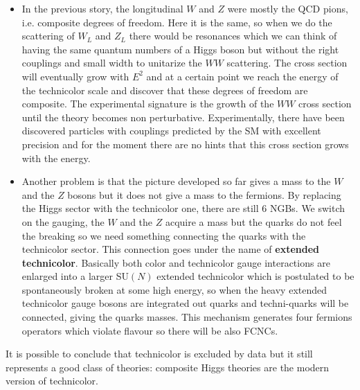 \documentclass[../main.tex]{subfiles}
\begin{document}
\begin{itemize}
    \item In the previous story, the longitudinal $W$ and $Z$ were mostly the QCD pions, i.e. composite degrees of freedom. Here it is the same, so when we do the scattering of $W_L$ and $Z_L$ there would be resonances which we can think of having the same quantum numbers of a Higgs boson but without the right couplings and small width to unitarize the $WW$ scattering. The cross section will eventually grow with $E^2$ and at a certain point we reach the energy of the technicolor scale and discover that these degrees of freedom are composite.
    The experimental signature is the growth of the $WW$ cross section until the theory becomes non perturbative.
    Experimentally, there have been discovered particles with couplings predicted by the SM with excellent precision and for the moment there are no hints that this cross section grows with the energy.
    \item Another problem is that the picture developed so far gives a mass to the $W$ and the $Z$ bosons but it does not give a mass to the fermions. By replacing the Higgs sector with the technicolor one, there are still 6 NGBs. We switch on the gauging, the $W$ and the $Z$ acquire a mass but the quarks do not feel the breaking so we need something connecting the quarks with the technicolor sector. This connection goes under the name of \textbf{extended technicolor}. Basically both color and technicolor gauge interactions are enlarged into a larger SU$(N)$ extended technicolor which is postulated to be spontaneously broken at some high energy, so when the heavy extended technicolor gauge bosons are integrated out quarks and techni-quarks will be connected, giving the quarks masses. This mechanism generates four fermions operators which violate flavour so there will be also FCNCs.
\end{itemize}
It is possible to conclude that technicolor is excluded by data but it still represents a good class of theories: composite Higgs theories are the modern version of technicolor. 
\end{document}
